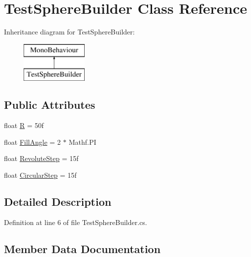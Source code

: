 \hypertarget{class_test_sphere_builder}{}\section{Test\+Sphere\+Builder Class Reference}
\label{class_test_sphere_builder}
Inheritance diagram for Test\+Sphere\+Builder\+:\begin{figure}[H]
\begin{center}
\leavevmode
\includegraphics[height=2.000000cm]{class_test_sphere_builder}
\end{center}
\end{figure}
\subsection*{Public Attributes}
\begin{DoxyCompactItemize}
\item 
float \mbox{\hyperlink{class_test_sphere_builder_a2df230f71771bed5c9536e3dc1b0e400}{R}} = 50f
\item 
float \mbox{\hyperlink{class_test_sphere_builder_a2f2519aa35b59088558b1278b39785f6}{Fill\+Angle}} = 2 $\ast$ Mathf.\+PI
\item 
float \mbox{\hyperlink{class_test_sphere_builder_acfeb82ac98b24881642783bfc56f5bfa}{Revolute\+Step}} = 15f
\item 
float \mbox{\hyperlink{class_test_sphere_builder_ac016d41c470e1f798516fdaf2a0a261d}{Circular\+Step}} = 15f
\end{DoxyCompactItemize}


\subsection{Detailed Description}


Definition at line 6 of file Test\+Sphere\+Builder.\+cs.



\subsection{Member Data Documentation}
\mbox{\label{class_test_sphere_builder_ac016d41c470e1f798516fdaf2a0a261d}} 
